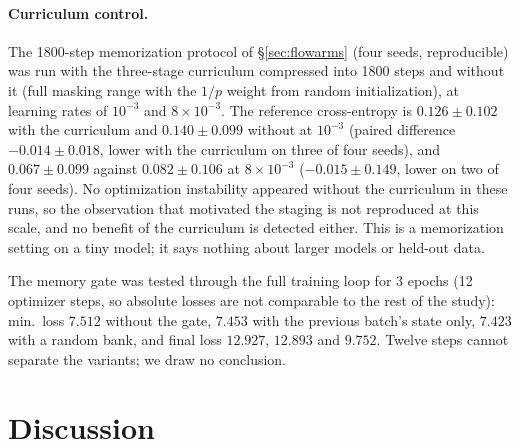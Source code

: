 \documentclass[11pt]{article}
\begin{document}
\paragraph{Curriculum control.}\label{sec:curriculum-control} The 1800-step memorization protocol of
\S\ref{sec:flowarms} (four seeds, reproducible) was run with the three-stage curriculum compressed into 1800 steps and
without it (full masking range with the $1/p$ weight from random initialization), at learning rates of $10^{-3}$ and
$8\times10^{-3}$. The reference cross-entropy is $0.126\pm0.102$ with the curriculum and $0.140\pm0.099$ without at
$10^{-3}$ (paired difference $-0.014\pm0.018$, lower with the curriculum on three of four seeds), and $0.067\pm0.099$
against $0.082\pm0.106$ at $8\times10^{-3}$ ($-0.015\pm0.149$, lower on two of four seeds). No optimization instability
appeared without the curriculum in these runs, so the observation that motivated the staging is not reproduced at this
scale, and no benefit of the curriculum is detected either. This is a memorization setting on a tiny model; it says
nothing about larger models or held-out data.


The memory gate was tested through the full training loop for 3 epochs (12
optimizer steps, so absolute losses are not comparable to the rest of the
study): min.\ loss $7.512$ without the gate, $7.453$ with the previous batch's
state only, $7.423$ with a random bank, and final loss $12.927$, $12.893$ and
$9.752$. Twelve steps cannot separate the variants; we draw no conclusion.

\section{Discussion}
\end{document}
